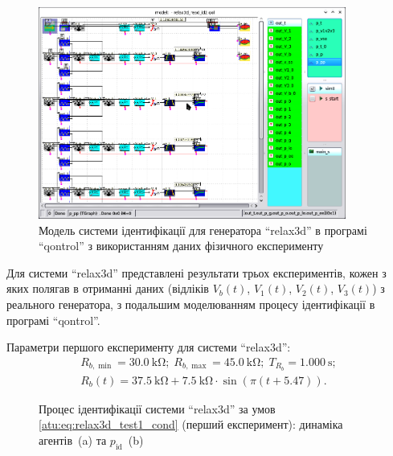 \begin{figure}[htb!]
  \centerline{\includegraphics[width=0.9\textwidth]{p/relax3d_id_qontrol.png} }
\caption{Модель системи ідентифікації для генератора ``relax3d'' в програмі ``qontrol'' з використанням даних фізичного експерименту}
\label{atu:f:relax3d_id_qontrol}
\end{figure}

Для системи ``relax3d'' представлені результати трьох експериментів,
кожен з яких полягав в отриманні даних (відліків
$V_b(t)$,
$V_1(t)$,
$V_2(t)$,
$V_3(t)$) з реального генератора, з подальшим моделюванням процесу
ідентифікації в програмі ``qontrol''.

Параметри першого експерименту для системи ``relax3d'':
%
\begin{equation}
  \begin{array}{c}
    R_{b,\min} = \SI{30.0}{\kilo\ohm};
    \;
    R_{b,\max} = \SI{45.0}{\kilo\ohm};
    \;
    T_{R_b} = \SI{1.000}{\second};
  \\
    R_b(t) = \SI{37.5}{\kilo\ohm} + \SI{7.5}{\kilo\ohm} \cdot \sin( \pi ( t + 5.47 ) ).
  \end{array}
  \label{atu:eq:relax3d_test1_cond}
\end{equation}

\begin{figure}[htb!]
  \caption{Процес ідентифікації системи ``relax3d'' за умов \ref{atu:eq:relax3d_test1_cond} (перший експеримент): динаміка агентів~(a) та $p_\mathrm{id}$~(b)}
  \label{atu:f:relax3d_id_1}
\end{figure}

